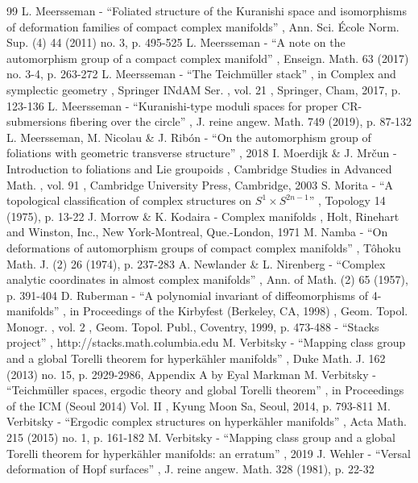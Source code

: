 \documentclass[10pt]{amsart}
\theoremstyle{plain}
\theoremstyle{definition}
\theoremstyle{remark}
\numberwithin{equation}{section}
\begin{document}
\begin{thebibliography}{99}
 L. Meersseman - “Foliated structure of the Kuranishi space and isomorphisms of deformation families of compact complex manifolds” , Ann. Sci. École Norm. Sup. (4) 44 (2011) no. 3, p. 495-525
 L. Meersseman - “A note on the automorphism group of a compact complex manifold” , Enseign. Math. 63 (2017) no. 3-4, p. 263-272
 L. Meersseman - “The Teichmüller stack” , in Complex and symplectic geometry , Springer INdAM Ser. , vol. 21 , Springer, Cham, 2017, p. 123-136
 L. Meersseman - “Kuranishi-type moduli spaces for proper CR-submersions fibering over the circle” , J. reine angew. Math. 749 (2019), p. 87-132
 L. Meersseman, M. Nicolau \& J. Ribón - “On the automorphism group of foliations with geometric transverse structure” , 2018
 I. Moerdijk \& J. Mrčun - Introduction to foliations and Lie groupoids , Cambridge Studies in Advanced Math. , vol. 91 , Cambridge University Press, Cambridge, 2003
 S. Morita - “A topological classification of complex structures on $S^{1}\times S^{2n-1}$” , Topology 14 (1975), p. 13-22
 J. Morrow \& K. Kodaira - Complex manifolds , Holt, Rinehart and Winston, Inc., New York-Montreal, Que.-London, 1971
 M. Namba - “On deformations of automorphism groups of compact complex manifolds” , Tôhoku Math. J. (2) 26 (1974), p. 237-283
 A. Newlander \& L. Nirenberg - “Complex analytic coordinates in almost complex manifolds” , Ann. of Math. (2) 65 (1957), p. 391-404
 D. Ruberman - “A polynomial invariant of diffeomorphisms of 4-manifolds” , in Proceedings of the Kirbyfest (Berkeley, CA, 1998) , Geom. Topol. Monogr. , vol. 2 , Geom. Topol. Publ., Coventry, 1999, p. 473-488
 - “Stacks project” , http://stacks.math.columbia.edu
 M. Verbitsky - “Mapping class group and a global Torelli theorem for hyperkähler manifolds” , Duke Math. J. 162 (2013) no. 15, p. 2929-2986, Appendix A by Eyal Markman
 M. Verbitsky - “Teichmüller spaces, ergodic theory and global Torelli theorem” , in Proceedings of the ICM (Seoul 2014) Vol. II , Kyung Moon Sa, Seoul, 2014, p. 793-811
 M. Verbitsky - “Ergodic complex structures on hyperkähler manifolds” , Acta Math. 215 (2015) no. 1, p. 161-182
 M. Verbitsky - “Mapping class group and a global Torelli theorem for hyperkähler manifolds: an erratum” , 2019
 J. Wehler - “Versal deformation of Hopf surfaces” , J. reine angew. Math. 328 (1981), p. 22-32
\end{thebibliography}
\end{document}
